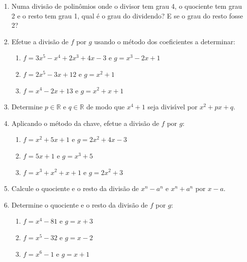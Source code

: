 \documentclass[a4paper,5pt]{amsbook}
\begin{document}
\vspace{1cm}
\begin{enumerate}
	\vspace{0.5cm}
	\item Numa divis\~ao de polin\^omios onde o divisor tem grau 4, o quociente tem
		grau 2 e o resto tem grau 1, qual \'e o grau do dividendo? E se o grau do
		resto fosse 2?

	\vspace{0.5cm}
	\item Efetue a divis\~ao de $f$ por $g$ usando o m\'etodo dos coeficientes a
		determinar:
		\begin{enumerate}
			\item $f=3x^5-x^4+2x^3+4x-3$ e $g=x^3-2x+1$
			\item $f=2x^5-3x+12$ e $g=x^2+1$
			\item $f=x^4-2x+13$ e $g=x^2+x+1$
		\end{enumerate}

	\vspace{0.5cm}
	\item Determine $p\in\mathbb{R}$ e $q\in\mathbb{R}$ de modo que $x^4+1$
		seja divis\'{\i}vel por $x^2+px+q$.

	\vspace{0.5cm}
	\item Aplicando o m\'etodo da chave, efetue a divis\~ao de $f$ por $g$:
		\begin{enumerate}
			\item $f=x^2+5x+1$ e $g=2x^2+4x-3$
			\item $f=5x+1$ e $g=x^3+5$
			\item $f=x^3+x^2+x+1$ e $g=2x^2+3$
		\end{enumerate}

	\vspace{0.5cm}
	\item Calcule o quociente e o resto da divis\~ao de $x^n-a^n$ e $x^n+a^n$ por
		$x-a$.

	\vspace{0.5cm}
	\item Determine o quociente e o resto da divis\~ao de $f$ por $g$:
		\begin{enumerate}
			\item $f=x^4-81$ e $g=x+3$
			\item $f=x^5-32$ e $g=x-2$
			\item $f=x^6-1$ e $g=x+1$
		\end{enumerate}


\end{enumerate}
\end{document}
